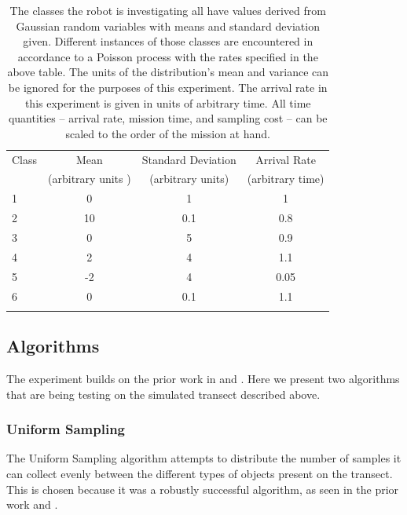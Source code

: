 \begin{table}[htpd!]
	\centering
	\begin{tabular}{l|ccc}
		Class & Mean & Standard Deviation & Arrival Rate\\
							 & (arbitrary units )  & (arbitrary units) & (arbitrary time)\\
 		\hline
		1 & 0 & 1 & 1\\
		2 & 10 & 0.1 & 0.8 \\
		3 & 0 & 5 & 0.9\\
		4 & 2 & 4 & 1.1\\
		5 & -2 & 4 & 0.05\\
		6 & 0 & 0.1 & 1.1\\
		\hline 
		\\
	\end{tabular}
	\caption{The classes the robot is investigating all have values derived from Gaussian random variables with means and standard deviation given.  Different instances of those classes are encountered in accordance to a Poisson process with the rates specified in the above table.  The units of the distribution's mean and variance can be ignored for the purposes of this experiment.  The arrival rate in this experiment is given in units of arbitrary time.  All time quantities -- arrival rate, mission time, and sampling cost -- can be scaled to the order of the mission at hand.}
	\label{tbl:classes}
\end{table}

\subsection{Algorithms}


The experiment builds on the prior work in \cite{furlong2014sequential} and \cite{furlong2014budgeting}.  Here we present two algorithms that are being testing on the simulated transect described above.

\subsubsection{Uniform Sampling}

The Uniform Sampling algorithm attempts to distribute the number of samples it
can collect evenly between the different types of objects present on the
transect.  This is chosen because it was a robustly successful algorithm, as
seen in the prior work \cite{furlong2014sequential} and \cite{furlong2014budgeting}.

